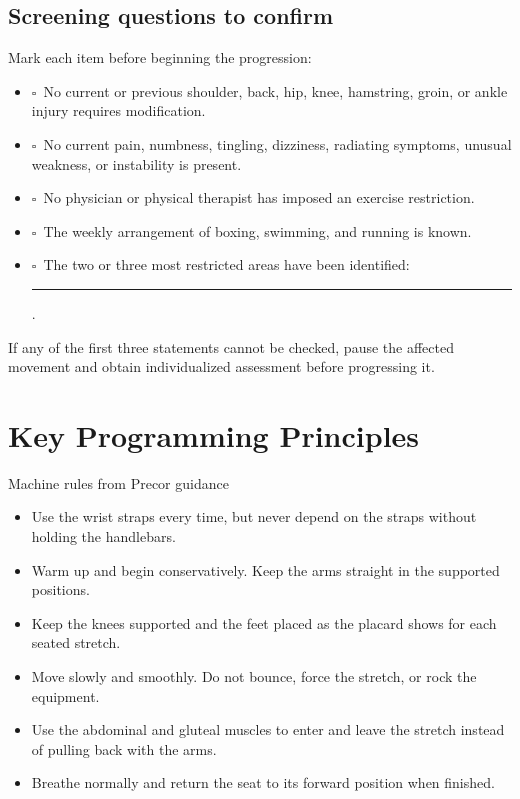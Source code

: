 \documentclass[10pt,letterpaper]{article}
\newcommand{\checkbox}{\(\square\)}
\begin{document}
\subsection{Screening questions to confirm}

Mark each item before beginning the progression:

\begin{itemize}
  \item \checkbox\ No current or previous shoulder, back, hip, knee, hamstring, groin, or ankle injury requires modification.
  \item \checkbox\ No current pain, numbness, tingling, dizziness, radiating symptoms, unusual weakness, or instability is present.
  \item \checkbox\ No physician or physical therapist has imposed an exercise restriction.
  \item \checkbox\ The weekly arrangement of boxing, swimming, and running is known.
  \item \checkbox\ The two or three most restricted areas have been identified: \rule{2.1in}{0.4pt}.
\end{itemize}

If any of the first three statements cannot be checked, pause the affected movement and obtain individualized assessment before progressing it.

\section{Key Programming Principles}

\begin{callout}{Machine rules from Precor guidance}
\begin{itemize}
  \item Use the wrist straps every time, but never depend on the straps without holding the handlebars.
  \item Warm up and begin conservatively. Keep the arms straight in the supported positions.
  \item Keep the knees supported and the feet placed as the placard shows for each seated stretch.
  \item Move slowly and smoothly. Do not bounce, force the stretch, or rock the equipment.
  \item Use the abdominal and gluteal muscles to enter and leave the stretch instead of pulling back with the arms.
  \item Breathe normally and return the seat to its forward position when finished.
\end{itemize}
\end{callout}
\end{document}
